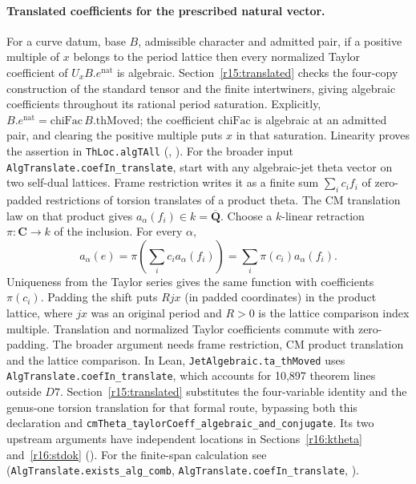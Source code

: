 \paragraph{Translated coefficients for the prescribed natural vector.}
\label{r15:jets}
For a curve datum, base $B$, admissible character and admitted pair,
if a positive multiple of $x$ belongs to the period lattice then every
normalized Taylor coefficient of $U_x B.e^{\mathrm{nat}}$ is algebraic.
Section~\ref{r15:translated} checks the four-copy construction of
the standard tensor and the finite intertwiners, giving algebraic
coefficients throughout its rational period saturation. Explicitly,
$B.e^{\mathrm{nat}}=\mathrm{chiFac}\,B.\mathrm{thMoved}$; the coefficient
$\mathrm{chiFac}$ is algebraic at an admitted pair, and clearing the
positive multiple puts $x$ in that saturation. Linearity proves the
assertion in \nolinkurl{ThLoc.algTAll}
(,
). For the broader input
\nolinkurl{AlgTranslate.coefIn_translate}, start with any algebraic-jet
theta vector on two self-dual lattices. Frame restriction writes it as
a finite sum $\sum_i c_i f_i$ of zero-padded restrictions of torsion
translates of a product theta. The CM translation law on that product
gives $a_\alpha(f_i)\in k=\overline{\mathbf Q}$. Choose a $k$-linear
retraction $\pi:\mathbf C\to k$ of the inclusion. For every $\alpha$,
\[
 a_\alpha(e)=\pi\!\left(\sum_i c_i a_\alpha(f_i)\right)
            =\sum_i\pi(c_i)a_\alpha(f_i).
\]
Uniqueness from the Taylor series gives the same function with
coefficients $\pi(c_i)$. Padding the shift puts $Rjx$ (in padded
coordinates) in the product lattice, where $jx$ was an original
period and $R>0$ is the lattice comparison index multiple. Translation
and normalized Taylor coefficients commute with zero-padding.
The broader argument needs frame restriction, CM product translation
and the lattice comparison. In Lean, \nolinkurl{JetAlgebraic.ta_thMoved} uses
\nolinkurl{AlgTranslate.coefIn_translate}, which accounts for 10,897
theorem lines outside $D7$. Section~\ref{r15:translated} substitutes
the four-variable identity and the genus-one torsion translation for
that formal route, bypassing both this declaration and
\nolinkurl{cmTheta_taylorCoeff_algebraic_and_conjugate}. Its two
upstream arguments have independent locations in
Sections~\ref{r16:ktheta} and~\ref{r16:stdok}
().
For the finite-span calculation see
(\nolinkurl{AlgTranslate.exists_alg_comb}, \nolinkurl{AlgTranslate.coefIn_translate},
).

